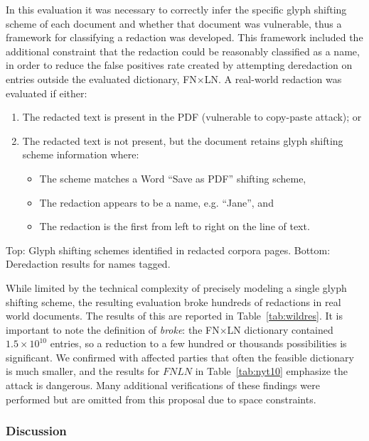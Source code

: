 In this evaluation it was necessary to correctly infer the specific glyph shifting scheme of each document and whether that document was vulnerable, thus a framework for classifying a redaction was developed.
This framework included the additional constraint that the redaction could be reasonably classified as a name, in order to reduce the false positives rate created by attempting deredaction on entries outside the evaluated dictionary, FN$\times$LN.
A real-world redaction was evaluated if either:
\begin{enumerate}[nosep]
    \item The redacted text is present in the PDF (vulnerable to copy-paste attack); or
    \item The redacted text is not present, but the document retains glyph shifting scheme information where:
        \begin{itemize}[nosep]
            \item The scheme matches a Word ``Save as PDF'' shifting scheme,
            \item The redaction appears to be a name, e.g. ``Jane'', and
            \item The redaction is the first from left to right on the line of text.
        \end{itemize}
\end{enumerate}

\begin{table}
  \centering
    \caption{Top: Glyph shifting schemes identified in redacted corpora pages. Bottom: Deredaction results for names tagged.}
\label{tab:wildres}
\small
\end{table}

While limited by the technical complexity of precisely modeling a single glyph shifting scheme, the resulting evaluation broke hundreds of redactions in real world documents. 
The results of this are reported in Table~\ref{tab:wildres}.
It is important to note the definition of \emph{broke}: the FN$\times$LN dictionary contained $1.5 \times 10^{10}$ entries, so a reduction to a few hundred or thousands possibilities is significant.
We confirmed with affected parties that often the feasible dictionary is much smaller, and the results for $FNLN$ in Table~\ref{tab:nyt10} emphasize the attack is dangerous.
Many additional verifications of these findings were performed but are omitted from this proposal due to space constraints.

\subsubsection{Discussion}

